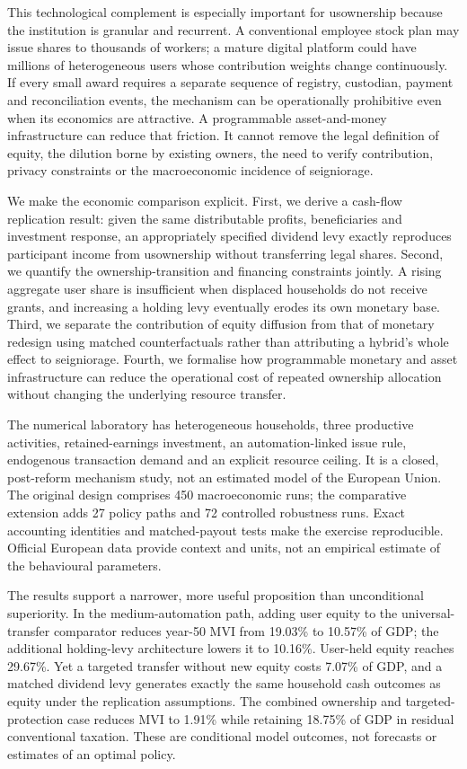 This technological complement is especially important for usownership because the institution is granular and recurrent. A conventional employee stock plan may issue shares to thousands of workers; a mature digital platform could have millions of heterogeneous users whose contribution weights change continuously. If every small award requires a separate sequence of registry, custodian, payment and reconciliation events, the mechanism can be operationally prohibitive even when its economics are attractive. A programmable asset-and-money infrastructure can reduce that friction. It cannot remove the legal definition of equity, the dilution borne by existing owners, the need to verify contribution, privacy constraints or the macroeconomic incidence of seigniorage.

We make the economic comparison explicit. First, we derive a cash-flow replication result: given the same distributable profits, beneficiaries and investment response, an appropriately specified dividend levy exactly reproduces participant income from usownership without transferring legal shares. Second, we quantify the ownership-transition and financing constraints jointly. A rising aggregate user share is insufficient when displaced households do not receive grants, and increasing a holding levy eventually erodes its own monetary base. Third, we separate the contribution of equity diffusion from that of monetary redesign using matched counterfactuals rather than attributing a hybrid's whole effect to seigniorage. Fourth, we formalise how programmable monetary and asset infrastructure can reduce the operational cost of repeated ownership allocation without changing the underlying resource transfer.

The numerical laboratory has heterogeneous households, three productive activities, retained-earnings investment, an automation-linked issue rule, endogenous transaction demand and an explicit resource ceiling. It is a closed, post-reform mechanism study, not an estimated model of the European Union. The original design comprises 450 macroeconomic runs; the comparative extension adds 27 policy paths and 72 controlled robustness runs. Exact accounting identities and matched-payout tests make the exercise reproducible. Official European data provide context and units, not an empirical estimate of the behavioural parameters.

The results support a narrower, more useful proposition than unconditional superiority. In the medium-automation path, adding user equity to the universal-transfer comparator reduces year-50 MVI from 19.03\% to 10.57\% of GDP; the additional holding-levy architecture lowers it to 10.16\%. User-held equity reaches 29.67\%. Yet a targeted transfer without new equity costs 7.07\% of GDP, and a matched dividend levy generates exactly the same household cash outcomes as equity under the replication assumptions. The combined ownership and targeted-protection case reduces MVI to 1.91\% while retaining 18.75\% of GDP in residual conventional taxation. These are conditional model outcomes, not forecasts or estimates of an optimal policy.

